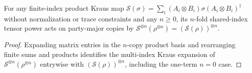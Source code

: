 \begin{theorem}
  \label{thm:finite_copy_tensor_operation}
  \leanok
  For any finite-index product Kraus map $\mathcal{S}(\sigma) = \sum_i (A_i \otimes B_i)\sigma(A_i \otimes B_i)^\dagger$ without normalization or trace constraints and any $n \ge 0$, its $n$-fold shared-index tensor power acts on party-major copies by $\mathcal{S}^{\otimes n}(\rho^{\otimes n}) = (\mathcal{S}(\rho))^{\otimes n}$.
\end{theorem}
\begin{proof}
  \leanok
  Expanding matrix entries in the $n$-copy product basis and rearranging finite sums and products identifies the multi-index Kraus expansion of $\mathcal{S}^{\otimes n}(\rho^{\otimes n})$ entrywise with $(\mathcal{S}(\rho))^{\otimes n}$, including the one-term $n = 0$ case.
\end{proof}
